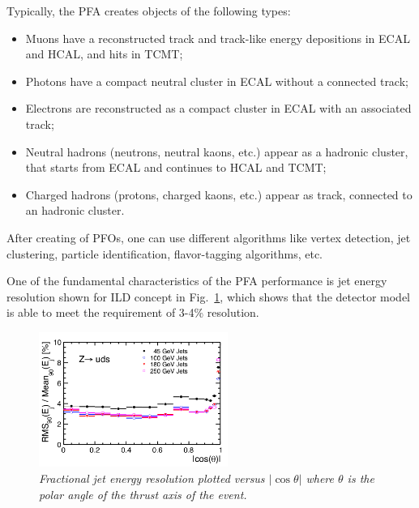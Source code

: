 Typically, the PFA creates objects of the following types:
\begin{itemize}
\item Muons have a reconstructed track and track-like energy depositions in ECAL and HCAL, and hits in TCMT;
\item Photons have a compact neutral cluster in ECAL without a connected track;
\item Electrons are reconstructed as a compact cluster in ECAL with an associated track;

\item Neutral hadrons (neutrons, neutral kaons, etc.) appear as a hadronic cluster, that starts from ECAL and continues to HCAL and TCMT;
\item Charged hadrons (protons, charged kaons, etc.) appear as track, connected to an hadronic cluster.
\end{itemize}

After creating of PFOs, one can use different algorithms like vertex detection, jet clustering, particle identification, flavor-tagging algorithms, etc.

One of the fundamental characteristics of the PFA performance is jet energy resolution shown for ILD concept in Fig.~\ref{fig:ILCjetrms}, which shows that the detector model is able to meet the requirement of 3-4\% resolution.

\begin{figure}[H]
{\centering
    \includegraphics[width=0.55\textwidth]{graphics/ILCjetrms.png}
    \caption{\sl Fractional jet energy resolution plotted versus $|\cos\theta|$ where $\theta$ is the polar angle of the thrust axis of the event.}
    \label{fig:ILCjetrms}
  }
\end{figure}




